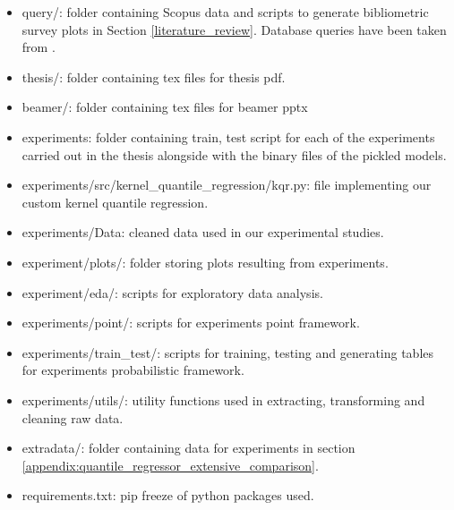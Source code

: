 \begin{itemize}
    \item query/: folder containing Scopus data and scripts to generate bibliometric survey plots in Section \ref{literature_review}. Database queries have been taken from \cite{nowotarski}.
    \item thesis/: folder containing tex files for thesis pdf.
    \item beamer/: folder containing tex files for beamer pptx %
    \item experiments: folder containing train, test script for each of the experiments carried out in the thesis alongside with the binary files of the pickled models.
    \item experiments/src/kernel\_quantile\_regression/kqr.py: file implementing our custom kernel quantile regression.
    \item experiments/Data: cleaned data used in our experimental studies.
    \item experiment/plots/: folder storing plots resulting from experiments.
    \item experiment/eda/: scripts for exploratory data analysis.
    \item experiments/point/: scripts for experiments point framework.
    \item experiments/train\_test/: scripts for training, testing and generating tables for experiments probabilistic framework.
    \item experiments/utils/: utility functions used in extracting, transforming and cleaning raw data.
    \item extradata/: folder containing data for experiments in section \ref{appendix:quantile_regressor_extensive_comparison}.
    \item requirements.txt: pip freeze of python packages used.
\end{itemize}
